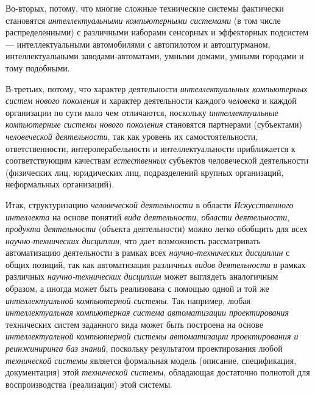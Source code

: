 \begin{textitemize}
	\item
	Во-вторых, потому, что многие сложные технические системы фактически становятся \textit{интеллектуальными компьютерными системами} (в том числе распределенными) с различными наборами сенсорных и эффекторных подсистем --- интеллектуальными автомобилями с автопилотом и автоштурманом, интеллектуальными заводами-автоматами, умными домами, умными городами и тому подобными.
	\item
	В-третьих, потому, что характер деятельности \textit{интеллектуальных компьютерных систем нового поколения} и характер деятельности каждого \textit{человека} и каждой организации по сути мало чем отличаются, поскольку \textit{интеллектуальные компьютерные системы нового поколения} становятся  партнерами (субъектами) \textit{человеческой деятельности}, так как уровень их самостоятельности, ответственности, интероперабельности и интеллектуальности приближается к соответствующим качествам \textit{естественных} субъектов человеческой деятельности (физических лиц, юридических лиц, подразделений крупных организаций, неформальных организаций).
\end{textitemize}

Итак, структуризацию \textit{человеческой деятельности} в области \textit{Искусственного интеллекта} на основе понятий \textit{вида деятельности}, \textit{области деятельности}, \textit{продукта деятельности} (объекта деятельности) можно легко обобщить для всех \textit{научно-технических дисциплин}, что дает возможность рассматривать автоматизацию деятельности в рамках всех \textit{научно-технических дисциплин} с общих позиций, так как автоматизация различных \textit{видов деятельности} в рамках различных \textit{научно-технических дисциплин} может выглядеть аналогичным образом, а иногда может быть реализована с помощью одной и той же \textit{интеллектуальной компьютерной системы}. Так например, любая \textit{интеллектуальная компьютерная система автоматизации проектирования} технических систем заданного вида может быть построена на основе \textit{интеллектуальной компьютерной системы автоматизации проектирования и реинжиниринга баз знаний}, поскольку результатом проектирования любой \textit{технической системы} является формальная модель (описание, спецификация, документация) этой \textit{технической системы}, обладающая достаточно полнотой для воспроизводства (реализации) этой системы.

